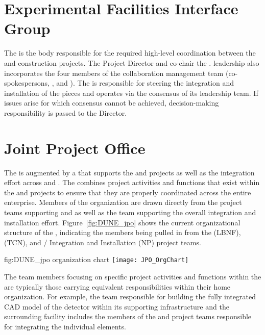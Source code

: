 \section{Experimental Facilities Interface Group}
\label{sec:efig}

The  is the body responsible for the required high-level
coordination between the  and  construction 
projects.  The  Project Director and  
co-chair the .   leadership also incorporates 
the four members of the  collaboration management 
team (co-spokespersons, , and ).  
The  is responsible for steering the integration and 
installation of the  pieces and operates via the 
consensus of its leadership team.  If issues arise for which consensus 
cannot be achieved, decision-making responsibility is passed to the 
 Director.

\section{Joint Project Office}
\label{sec:jpo}

The  is augmented by a  that supports the
 and  projects as well as the integration
effort across  and . The  
combines project activities and functions that exist within the 
 and  projects to ensure that they are 
properly coordinated across the entire enterprise.  Members of 
the  organization are drawn directly from the project 
teams supporting  and  as well as the 
team supporting the overall integration and installation effort.  
Figure~\ref{fig:DUNE_jpo} shows the current organizational 
structure of the , indicating the members being 
pulled in from the  (LBNF),  (TCN), and 
/ Integration and Installation (NP) 
project teams.
\begin{dunefigure}{fig:DUNE_jpo}
  { organization chart}
  \texttt{[image: JPO\_OrgChart]}
\end{dunefigure}
The team members focusing on specific project activities and 
functions within the  are typically those carrying 
equivalent responsibilities within their home organization.  For 
example, the  team responsible for building the fully 
integrated CAD model of the detector within its supporting 
infrastructure and the surrounding facility includes the members 
of the  and  project teams responsible 
for integrating the individual elements.


